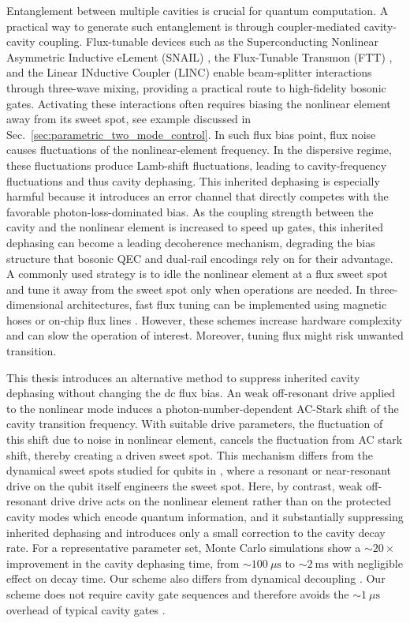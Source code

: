 Entanglement between multiple cavities is crucial for quantum computation. A practical way to generate such entanglement is through coupler-mediated cavity-cavity coupling. Flux-tunable devices such as the Superconducting Nonlinear Asymmetric Inductive eLement (SNAIL) \cite{SNAIL}, the Flux-Tunable Transmon (FTT) \cite{squid}, and the Linear INductive Coupler (LINC) \cite{linc} enable beam-splitter interactions through three-wave mixing, providing a practical route to high-fidelity bosonic gates. Activating these interactions often requires biasing the nonlinear element away from its sweet spot, see example discussed in Sec.\ \ref{sec:parametric_two_mode_control}. In such flux bias point, flux noise causes fluctuations of the nonlinear-element frequency. In the dispersive regime, these fluctuations produce Lamb-shift fluctuations, leading to cavity-frequency fluctuations and thus cavity dephasing. This inherited dephasing is especially harmful because it introduces an error channel that directly competes with the favorable photon-loss-dominated bias. As the coupling strength between the cavity and the nonlinear element is increased to speed up gates, this inherited dephasing can become a leading decoherence mechanism, degrading the bias structure that bosonic QEC and dual-rail encodings rely on for their advantage.
A commonly used strategy is to idle the nonlinear element at a flux sweet spot and tune it away from the sweet spot only when operations are needed. In three-dimensional architectures, fast flux tuning can be implemented using magnetic hoses \cite{magnetichose1,magnetichose2} or on-chip flux lines \cite{li2025,valadares2026}. However, these schemes increase hardware complexity and can slow the operation of interest. Moreover, tuning flux might risk unwanted transition. 

This thesis introduces an alternative method to suppress inherited cavity dephasing without changing the dc flux bias. An weak off-resonant drive applied to the nonlinear mode induces a photon-number-dependent AC-Stark shift of the cavity transition frequency. With suitable drive parameters, the fluctuation of this shift due to noise in nonlinear element, cancels the fluctuation from AC stark shift, thereby creating a driven sweet spot. This mechanism differs from the dynamical sweet spots studied for qubits in \cite{PhysRevApplied.15.034065floquetqubit,PhysRevApplied.12.054015dss2}, where a resonant or near-resonant drive on the qubit itself engineers the sweet spot. Here, by contrast, weak off-resonant drive drive acts on the nonlinear element rather than on the protected cavity modes which encode quantum information, and it substantially suppressing inherited dephasing and introduces only a small correction to the cavity decay rate. For a representative parameter set, Monte Carlo simulations show a \(\sim 20\times\) improvement in the cavity dephasing time, from \(\sim 100~\mu\text{s}\) to \(\sim 2~\text{ms}\) with negligible effect on decay time. Our scheme also differs from dynamical decoupling \cite{PhysRev.175.453DD}. Our scheme does not require cavity gate sequences and therefore avoids the \(\sim 1~\mu\text{s}\) overhead of typical cavity gates \cite{smcc-t465snap,eickbusch2022ecd}. 



